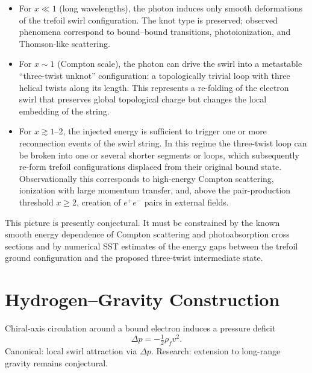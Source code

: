 \documentclass[10pt,reprint,aps,onecolumn,nofootinbib]{revtex4-2}
\newcommand{\rhof}{\rho_{\!f}}                           %
\begin{document}
        \begin{itemize}
            \item For $x \ll 1$ (long wavelengths), the photon induces only
            smooth deformations of the trefoil swirl configuration.  The
            knot type is preserved; observed phenomena correspond to
            bound--bound transitions, photoionization, and Thomson-like
            scattering.
            \item For $x \sim 1$ (Compton scale), the photon can drive the swirl
            into a metastable ``three-twist unknot'' configuration: a
            topologically trivial loop with three helical twists along its
            length.  This represents a re-folding of the electron swirl
            that preserves global topological charge but changes the local
            embedding of the string.
            \item For $x \gtrsim 1$--2, the injected energy is sufficient to
            trigger one or more reconnection events of the swirl string.
            In this regime the three-twist loop can be broken into one or
            several shorter segments or loops, which subsequently re-form
            trefoil configurations displaced from their original bound
            state.  Observationally this corresponds to high-energy
            Compton scattering, ionization with large momentum transfer,
            and, above the pair-production threshold $x\ge 2$, creation of
            $e^+e^-$ pairs in external fields.
        \end{itemize}

        This picture is presently conjectural.  It must be constrained by the
        known smooth energy dependence of Compton scattering and
        photoabsorption cross sections and by numerical SST estimates of the
        energy gaps between the trefoil ground configuration and the proposed
        three-twist intermediate state.


    \section{Hydrogen--Gravity Construction}\label{canon58:hydro-grav}
    Chiral-axis circulation around a bound electron induces a pressure deficit
    \[
        \Delta p = -\tfrac12 \rhof v^2.
    \]
    Canonical: local swirl attraction via $\Delta p$. %
    Research: extension to long-range gravity remains conjectural. %
\end{document}
